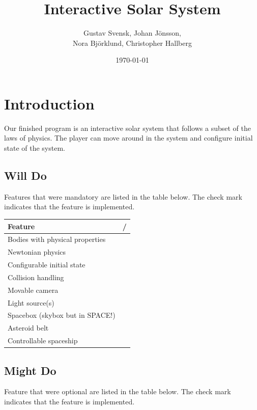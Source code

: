 \documentclass[a4paper,12pt]{article}
\title{Interactive Solar System}
\author{Gustav Svensk, Johan Jönsson, \\
    Nora Björklund, Christopher Hallberg}
\date{\today}
\newcommand{\cmark}{\ding{51}}%
\newcommand{\xmark}{\ding{55}}%
\begin{document}
\maketitle
{}
\tableofcontents
\newpage
\section{Introduction}
Our finished program is an interactive solar system that follows a subset of 
the laws of physics. The player can move around in the system and configure
initial state of the system.

\subsection{Will Do}
Features that were mandatory are listed in the table below. The check mark
indicates that the feature is implemented.
\begin{center}
        \begin{tabular}{|l|c|}
                \hline
                \textbf{Feature} & \cmark/\xmark \\
                \hline
                Bodies with physical properties & \cmark \\
                Newtonian physics & \cmark \\
                Configurable initial state & \cmark \\
                Collision handling & \cmark \\
                Movable camera & \cmark \\
                Light source(s) & \cmark \\
                Spacebox (skybox but in SPACE!) & \cmark \\
                Asteroid belt & \cmark \\
                Controllable spaceship & \cmark \\
                \hline

        \end{tabular}
\end{center}

\subsection{Might Do}
Feature that were optional are listed in the table below. The check mark
indicates that the feature is implemented.
\end{document}
